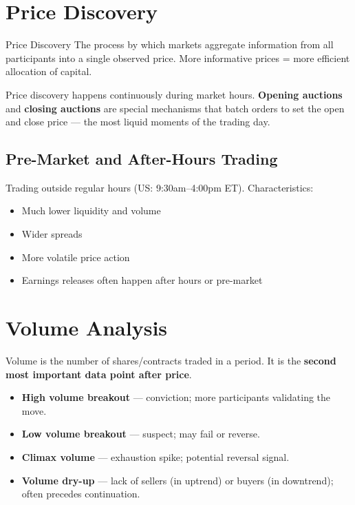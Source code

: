 \section{Price Discovery}

\begin{keyterm}{Price Discovery}
The process by which markets aggregate information from all participants into a single
observed price. More informative prices = more efficient allocation of capital.
\end{keyterm}

Price discovery happens continuously during market hours. \textbf{Opening auctions} and
\textbf{closing auctions} are special mechanisms that batch orders to set the open and
close price — the most liquid moments of the trading day.

\subsection{Pre-Market and After-Hours Trading}
Trading outside regular hours (US: 9:30am--4:00pm ET). Characteristics:
\begin{itemize}
  \item Much lower liquidity and volume
  \item Wider spreads
  \item More volatile price action
  \item Earnings releases often happen after hours or pre-market
\end{itemize}

\section{Volume Analysis}

Volume is the number of shares/contracts traded in a period.
It is the \textbf{second most important data point after price}.

\begin{itemize}
  \item \textbf{High volume breakout} — conviction; more participants validating the move.
  \item \textbf{Low volume breakout} — suspect; may fail or reverse.
  \item \textbf{Climax volume} — exhaustion spike; potential reversal signal.
  \item \textbf{Volume dry-up} — lack of sellers (in uptrend) or buyers (in downtrend);
        often precedes continuation.
\end{itemize}

